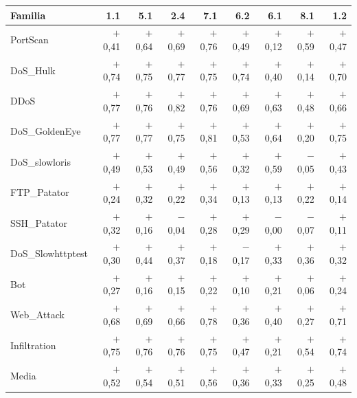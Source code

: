 \begin{tabular}{@{}lrrrrrrrr@{}}
\toprule
Familia & 1.1 & 5.1 & 2.4 & 7.1 & 6.2 & 6.1 & 8.1 & 1.2 \\
\midrule
PortScan & $+$0{,}41 & $+$0{,}64 & $+$0{,}69 & $+$0{,}76 & $+$0{,}49 & $+$0{,}12 & $+$0{,}59 & $+$0{,}47 \\
DoS\_Hulk & $+$0{,}74 & $+$0{,}75 & $+$0{,}77 & $+$0{,}75 & $+$0{,}74 & $+$0{,}40 & $+$0{,}14 & $+$0{,}70 \\
DDoS & $+$0{,}77 & $+$0{,}76 & $+$0{,}82 & $+$0{,}76 & $+$0{,}69 & $+$0{,}63 & $+$0{,}48 & $+$0{,}66 \\
DoS\_GoldenEye & $+$0{,}77 & $+$0{,}77 & $+$0{,}75 & $+$0{,}81 & $+$0{,}53 & $+$0{,}64 & $+$0{,}20 & $+$0{,}75 \\
DoS\_slowloris & $+$0{,}49 & $+$0{,}53 & $+$0{,}49 & $+$0{,}56 & $+$0{,}32 & $+$0{,}59 & $-$0{,}05 & $+$0{,}43 \\
FTP\_Patator & $+$0{,}24 & $+$0{,}32 & $+$0{,}22 & $+$0{,}34 & $+$0{,}13 & $+$0{,}13 & $+$0{,}22 & $+$0{,}14 \\
SSH\_Patator & $+$0{,}32 & $+$0{,}16 & $-$0{,}04 & $+$0{,}28 & $+$0{,}29 & $-$0{,}00 & $-$0{,}07 & $+$0{,}11 \\
DoS\_Slowhttptest & $+$0{,}30 & $+$0{,}44 & $+$0{,}37 & $+$0{,}18 & $-$0{,}17 & $+$0{,}33 & $+$0{,}36 & $+$0{,}32 \\
Bot & $+$0{,}27 & $+$0{,}16 & $+$0{,}15 & $+$0{,}22 & $+$0{,}10 & $+$0{,}21 & $+$0{,}06 & $+$0{,}24 \\
Web\_Attack & $+$0{,}68 & $+$0{,}69 & $+$0{,}66 & $+$0{,}78 & $+$0{,}36 & $+$0{,}40 & $+$0{,}27 & $+$0{,}71 \\
Infiltration & $+$0{,}75 & $+$0{,}76 & $+$0{,}76 & $+$0{,}75 & $+$0{,}47 & $+$0{,}21 & $+$0{,}54 & $+$0{,}74 \\
\midrule
Media & $+$0{,}52 & $+$0{,}54 & $+$0{,}51 & $+$0{,}56 & $+$0{,}36 & $+$0{,}33 & $+$0{,}25 & $+$0{,}48 \\
\bottomrule
\end{tabular}
